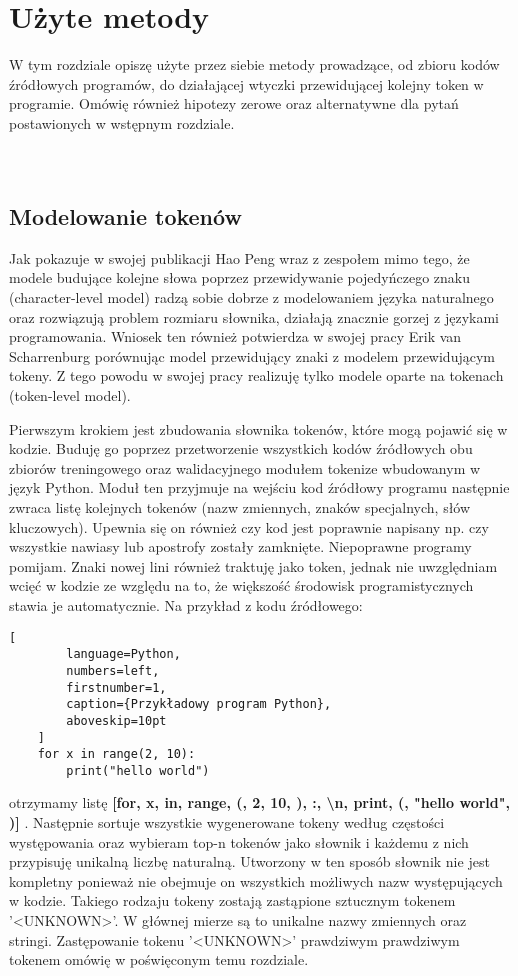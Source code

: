 \newpage %
\section{Użyte metody}
W tym rozdziale opiszę użyte przez siebie metody prowadzące, od zbioru kodów źródłowych programów, do działającej wtyczki 
przewidującej kolejny token w programie. Omówię również hipotezy zerowe oraz alternatywne dla pytań postawionych w wstępnym rozdziale.\\\\\\ 

\subsection{Modelowanie tokenów}
Jak pokazuje w swojej publikacji Hao Peng wraz z zespołem \cite{character-level} mimo tego, że modele budujące kolejne słowa poprzez 
przewidywanie pojedyńczego znaku (character-level model) radzą sobie dobrze z modelowaniem języka naturalnego oraz rozwiązują problem rozmiaru słownika, 
działają znacznie gorzej z językami programowania. Wniosek ten również potwierdza w swojej pracy Erik van Scharrenburg \cite{erik} porównując model przewidujący 
znaki z modelem przewidującym tokeny. Z tego powodu w swojej pracy realizuję tylko modele oparte na tokenach (token-level model). 

Pierwszym krokiem jest zbudowania słownika tokenów, które mogą pojawić się w kodzie. Buduję go poprzez przetworzenie wszystkich kodów źródłowych obu zbiorów treningowego oraz 
walidacyjnego modułem tokenize \cite{tokenize} wbudowanym w język Python. Moduł ten przyjmuje na wejściu kod źródłowy programu następnie zwraca listę kolejnych tokenów (nazw zmiennych, 
znaków specjalnych, słów kluczowych). Upewnia się on również czy kod jest poprawnie napisany np. czy wszystkie nawiasy lub apostrofy zostały zamknięte. Niepoprawne programy pomijam. 
Znaki nowej lini również traktuję jako token, jednak nie uwzględniam wcięć w kodzie ze względu na to, że większość środowisk programistycznych stawia je 
automatycznie. Na przykład z kodu źródłowego: 
\begin{addmargin}[10mm]{0mm}
    \begin{lstlisting}[
        language=Python,
        numbers=left,
        firstnumber=1,
        caption={Przykładowy program Python},
        aboveskip=10pt
    ]
    for x in range(2, 10): 
        print("hello world")
    \end{lstlisting}
    \end{addmargin}
otrzymamy listę \textbf{ [for, x, in, range, (, 2, 10, ), :, \textbackslash n, print, (, "hello world", )] }.
Następnie sortuje wszystkie wygenerowane tokeny według częstości występowania oraz wybieram top-n tokenów jako słownik i każdemu z nich przypisuję unikalną liczbę naturalną. 
Utworzony w ten sposób słownik nie jest kompletny ponieważ nie obejmuje on wszystkich możliwych nazw występujących w kodzie. Takiego rodzaju tokeny
zostają zastąpione sztucznym tokenem '<UNKNOWN>'. W głównej mierze są to unikalne nazwy zmiennych oraz stringi. Zastępowanie tokenu '<UNKNOWN>' prawdziwym prawdziwym tokenem omówię w 
poświęconym temu rozdziale. 

